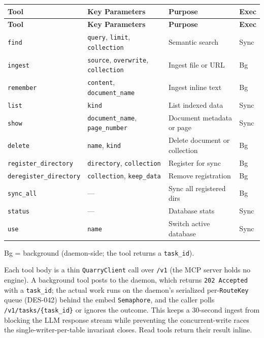 \documentclass[a4paper,10pt]{article}
\newcommand{\tool}[1]{\texttt{#1}}
\newcommand{\field}[1]{\texttt{#1}}
\begin{document}
\begin{center}
\small
\setlength{\tabcolsep}{4pt}
\begin{longtable}{lp{3.5cm}p{3.2cm}l}
\toprule
\textbf{Tool} & \textbf{Key Parameters} & \textbf{Purpose} &
  \textbf{Exec} \\
\midrule
\endfirsthead
\toprule
\textbf{Tool} & \textbf{Key Parameters} & \textbf{Purpose} &
  \textbf{Exec} \\
\midrule
\endhead
\tool{find}        & \field{query}, \field{limit},
  \field{collection}       & Semantic search            & Sync \\
\tool{ingest}      & \field{source}, \field{overwrite},
  \field{collection}       & Ingest file or URL         & Bg \\
\tool{remember}    & \field{content},
  \field{document\_name}   & Ingest inline text         & Bg \\
\tool{list}        & \field{kind}
                           & List indexed data          & Sync \\
\tool{show}        & \field{document\_name},
  \field{page\_number}     & Document metadata or page  & Sync \\
\tool{delete}      & \field{name}, \field{kind}
                           & Delete document or
                             collection                 & Bg \\
\tool{register\_directory}   & \field{directory},
  \field{collection}       & Register for sync          & Bg \\
\tool{deregister\_directory} & \field{collection},
  \field{keep\_data}       & Remove registration        & Bg \\
\tool{sync\_all}   & ---  & Sync all registered dirs   & Bg \\
\tool{status}      & ---  & Database stats             & Sync \\
\tool{use}         & \field{name}
                           & Switch active database     & Sync \\
\bottomrule
\end{longtable}
\end{center}

Bg = background (daemon-side; the tool returns a \field{task\_id}).

Each tool body is a thin \texttt{QuarryClient} call over \texttt{/v1}
(the MCP server holds no engine).  A background tool posts to the daemon,
which returns \texttt{202~Accepted} with a \field{task\_id}; the actual
work runs on the daemon's serialized per-\texttt{RouteKey} queue (DES-042)
behind the embed \texttt{Semaphore}, and the caller polls
\texttt{/v1/tasks/\{task\_id\}} or ignores the outcome.  This keeps a
30-second ingest from blocking the LLM response stream while preventing
the concurrent-write races the single-writer-per-table invariant closes.
Read tools return their result inline.
\end{document}
